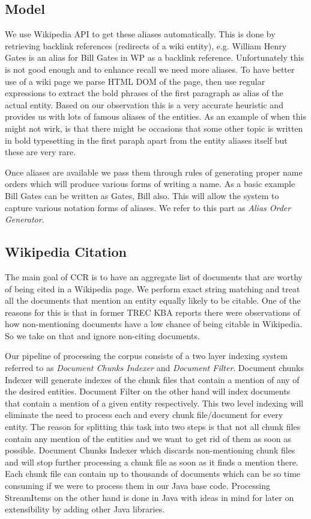 \subsection{Model}

We use Wikipedia API to get these aliases automatically. This is done by retrieving backlink references (redirects of a wiki entity), e.g. William Henry Gates is an alias for Bill Gates in WP as a backlink reference. Unfortunately this is not good enough and to enhance recall we need more aliases. To have better use of a wiki page we parse HTML DOM of the page, then use regular expressions to extract the bold phrases of the first paragraph as alias of the actual entity. Based on our observation this is a very accurate heuristic and provides us with lots of famous aliases of the entities. As an example of when this might not wirk, is that there might be occasions that some other topic is written in bold typesetting in the first paraph apart from the entity aliases itself but these are very rare.

Once aliases are available we pass them through rules of generating proper name orders which will produce various forms of writing a name. As a basic example Bill Gates can be written as Gates, Bill also. This will allow the system to capture various notation forms of aliases. We refer to this part as \textit{Alias Order Generator}.

\subsection{Wikipedia Citation}
The main goal of CCR is to have an aggregate list of documents that are worthy of being cited in a Wikipedia page. We perform exact string matching and treat all the documents that mention an entity equally likely to be citable. One of the reasons for this is that in former TREC KBA reports \cite{JFrank12} there were observations of how non-mentioning documents have a low chance of being citable in Wikipedia. So we take on that and ignore non-citing documents. 

Our pipeline of processing the corpus consists of a two layer indexing system referred to as \textit{Document Chunks Indexer} and \textit{Document Filter}. Document chunks Indexer will generate indexes of the chunk files that contain a mention of any of the desired entities. Document Filter on the other hand will index documents that contain a mention of a given entity respectively. This two level indexing will eliminate the need to process each and every chunk file/document for every entity. The reason for splitting this task into two steps is that not all chunk files contain any mention of the entities and we want to get rid of them as soon as possible. Document Chunks Indexer which discards non-mentioning chunk files and will stop further processing a chunk file as soon as it finds a mention there. Each chunk file can contain up to thousands of documents which can be so time consuming if we were to process them in our Java base code. Processing StreamItems on the other hand is done in Java with ideas in mind for later on extensibility by adding other Java libraries.


